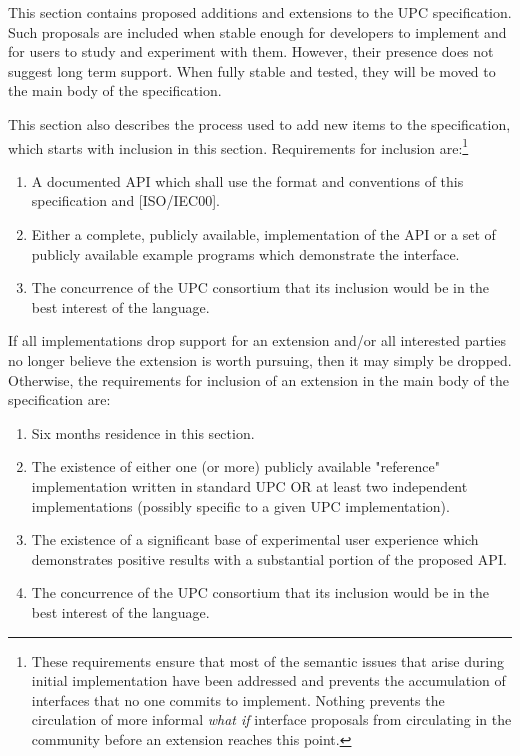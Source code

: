 \documentclass[12pt,titlepage]{article}
\newcounter{parnum}
\newcommand{\tab}{\textt{~~~~~~}}
\newcommand{\np}{
  \addtocounter{parnum}{1}
  \latex{\hspace{-2em}\makebox[2em][l]{\arabic{parnum}}}
  \html{{\bf {\arabic{parnum}}}\tab}}
\begin{document}
\np This section contains proposed additions and extensions to the UPC
     specification.  Such proposals are included when stable enough for
     developers to implement and for users to study and experiment with them.
     However, their presence does not suggest long term support.  When fully
     stable and tested, they will be moved to the main body of the specification.

\np This section also describes the process used to add new items to the 
    specification, which starts with inclusion in this section.  Requirements
    for inclusion are:\footnote{These requirements ensure that most of the
    semantic issues that arise during initial implementation have been addressed
    and prevents the accumulation of interfaces that no one commits to
    implement. Nothing prevents the circulation of more informal {\em what if} 
    interface proposals from circulating in the community before an extension
    reaches this point.} 

\begin{enumerate}
\item A documented API which shall use the format and conventions of
    this specification and [ISO/IEC00].

\item Either a complete, publicly available, implementation of the API
    or a set of publicly available example programs which demonstrate
    the interface.
    
\item The concurrence of the UPC consortium that its inclusion would be
    in the best interest of the language.    
\end{enumerate}

\np If all implementations drop support for an extension and/or all interested parties
    no longer believe the extension is worth pursuing, then it may simply be dropped.
    Otherwise, the requirements for inclusion of an extension in the main body of the
    specification are:

\begin{enumerate}
\item Six months residence in this section.

\item The existence of either one (or more) publicly available "reference" implementation 
written in standard UPC OR at least two independent implementations (possibly specific 
to a given UPC implementation).

\item The existence of a significant base of experimental user experience
   which demonstrates positive results with a substantial portion of the
   proposed API.

\item The concurrence of the UPC consortium that its inclusion would be
    in the best interest of the language.
\end{enumerate}
\end{document}
